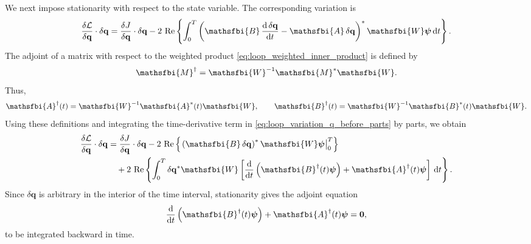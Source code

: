 \begin{appendices}
We next impose stationarity with respect to the state variable. The corresponding variation is
\begin{equation}
  \frac{\delta \mathcal{L}}{\delta \mathbf{q}}\cdot\delta\mathbf{q}
  =
  \frac{\delta J}{\delta \mathbf{q}}\cdot\delta\mathbf{q}
  -
  2\,\operatorname{Re}
  \left\{
  \int_{0}^{T}
    \left(
      \mathsfbi{B}\,\frac{\mathrm{d}\,\delta\mathbf{q}}{\mathrm{d}t}
      -
      \mathsfbi{A}\,\delta\mathbf{q}
    \right)^{*}
    \mathsfbi{W}\boldsymbol{\psi}
  \,\mathrm{d}t
  \right\}.
  \label{eq:loop_variation_q_before_parts}
\end{equation}
The adjoint of a matrix with respect to the weighted product \eqref{eq:loop_weighted_inner_product} is defined by
\begin{equation}
  \mathsfbi{M}^{\dagger}
  =
  \mathsfbi{W}^{-1}\mathsfbi{M}^{*}\mathsfbi{W}.
  \label{eq:loop_weighted_adjoint_definition}
\end{equation}
Thus,
\begin{equation}
  \mathsfbi{A}^{\dagger}(t)
  =
  \mathsfbi{W}^{-1}\mathsfbi{A}^{*}(t)\mathsfbi{W},
  \qquad
  \mathsfbi{B}^{\dagger}(t)
  =
  \mathsfbi{W}^{-1}\mathsfbi{B}^{*}(t)\mathsfbi{W}.
  \label{eq:loop_weighted_adjoint_AB}
\end{equation}
Using these definitions and integrating the time-derivative term in \eqref{eq:loop_variation_q_before_parts} by parts, we obtain
\begin{equation}
\begin{aligned}
  \frac{\delta \mathcal{L}}{\delta \mathbf{q}}\cdot\delta\mathbf{q}
  &=
  \frac{\delta J}{\delta \mathbf{q}}\cdot\delta\mathbf{q}
  -
  2\,\operatorname{Re}
  \left\{
  \left.
    \left(
      \mathsfbi{B}\,\delta\mathbf{q}
    \right)^{*}
    \mathsfbi{W}\boldsymbol{\psi}
  \right|_{0}^{T}
  \right\}
  \\
  &\quad
  +
  2\,\operatorname{Re}
  \left\{
  \int_{0}^{T}
    \delta\mathbf{q}^{*}
    \mathsfbi{W}
    \left[
      \frac{\mathrm{d}}{\mathrm{d}t}
      \left(
        \mathsfbi{B}^{\dagger}(t)\boldsymbol{\psi}
      \right)
      +
      \mathsfbi{A}^{\dagger}(t)\boldsymbol{\psi}
    \right]
  \,\mathrm{d}t
  \right\}.
\end{aligned}
\label{eq:loop_variation_q_after_parts}
\end{equation}
Since \(\delta\mathbf{q}\) is arbitrary in the interior of the time interval, stationarity gives the adjoint equation
\begin{equation}
  \frac{\mathrm{d}}{\mathrm{d}t}
  \left(
    \mathsfbi{B}^{\dagger}(t)\boldsymbol{\psi}
  \right)
  +
  \mathsfbi{A}^{\dagger}(t)\boldsymbol{\psi}
  =
  \mathbf{0},
  \label{eq:loop_adjoint_equation}
\end{equation}
to be integrated backward in time.


\end{appendices}
